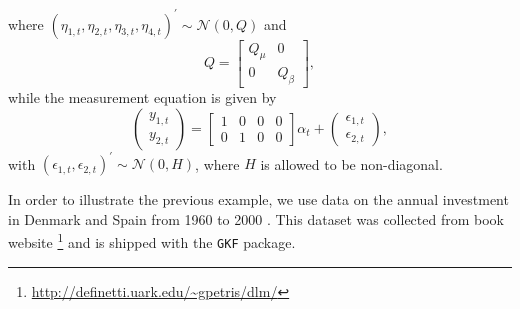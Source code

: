 \documentclass{article}
\newcommand{\GKF}{\texttt{GKF}\xspace}
\begin{document}
where $(\eta_{1,t},\eta_{2,t},\eta_{3,t},\eta_{4,t})^{\prime} \sim \mathcal{N}(0,Q)$ and
\begin{equation*}
  Q = \left[\begin{array}{c|c}
              Q_{\mu} & 0 \\ \hline
              0 & Q_{\beta}
            \end{array}\right]
  ,
\end{equation*}
while the measurement equation is given by
\begin{equation}
  \begin{pmatrix}
    y_{1,t}\\
    y_{2,t}
  \end{pmatrix}
  =
  \begin{bmatrix}
    1 & 0 & 0 & 0 \\
    0 & 1 & 0 & 0
  \end{bmatrix}
  \alpha_t +
  \begin{pmatrix}
    \epsilon_{1,t}\\
    \epsilon_{2,t}
  \end{pmatrix}
  ,
  \label{eq:LinearGrowthObs}
\end{equation}
with $(\epsilon_{1,t},\epsilon_{2,t})^\prime \sim \mathcal{N}(0,H)$, where $H$
is allowed to be non-diagonal.

In order to illustrate the previous example, we use data on the annual
investment in Denmark and Spain from 1960 to 2000 \citep[described
in][chap. 3.3.2]{petris2009dynamic}.  This dataset was collected from
\citet{petris2009dynamic} book website
\footnote{\url{http://definetti.uark.edu/~gpetris/dlm/}} and is shipped with the
\GKF package.
\end{document}

